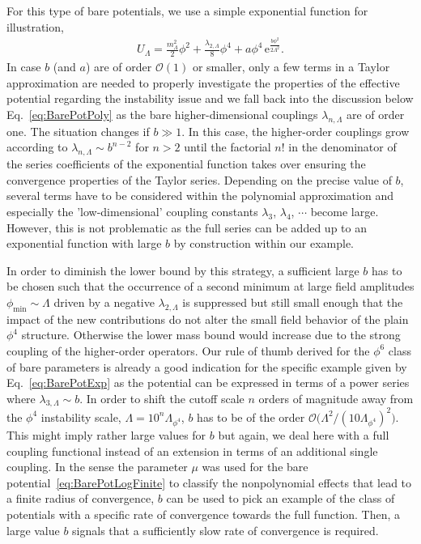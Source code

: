 \documentclass[twocolumn,aps,prd,showpacs,nofootinbib,superscriptaddress,preprintnumbers,floatfix,10pt]{revtex4-1}
\newcommand{\E}{\mathrm{e}}
\newcommand{\UL}{U_{\Lambda}}
\newcommand{\mL}{m_\Lambda^2}
\newcommand{\lL}{\lambda_{2,\Lambda}}
\begin{document}
For this type of bare potentials, we use a simple exponential function for illustration,
%
\begin{align}
 \UL = \frac{\mL}{2}\phi^{2} + \frac{\lL}{8}\phi^{4} + a \phi^{4}\, \E^{\frac{b\phi^2}{2\Lambda^{2}} }.
 \label{eq:BarePotExp}
\end{align}
%
In case $b$ (and $a$) are of order $\mathcal{O}(1)$ or smaller, only a few terms in a Taylor approximation are needed to properly investigate the properties of the effective potential regarding the instability issue and we fall back into the discussion below Eq.~\eqref{eq:BarePotPoly} as the bare higher-dimensional couplings $\lambda_{n,\Lambda}$ are of order one. 
The situation changes if $b\gg 1$. In this case, the higher-order couplings grow according to $\lambda_{n,\Lambda} \sim b^{n-2}$ for $n>2$ until the factorial $n!$ in the denominator of the series coefficients of the exponential function takes over ensuring the convergence properties of the Taylor series. Depending on the precise value of $b$, several terms have to be considered within the polynomial approximation and especially the 'low-dimensional' coupling constants $\lambda_{3}$, $\lambda_{4}$, $\cdots$ become large. 
However, this is not problematic as the full series can be added up to an exponential function with large $b$ by construction within our example. 


In order to diminish the lower bound by this strategy, a sufficient large $b$ has to be chosen such that the occurrence of a second minimum at large field amplitudes $\phi_{\mathrm{min}}\sim \Lambda$ driven by a negative $\lL$ is suppressed but still small enough that the impact of the new contributions do not alter the small field behavior of the plain $\phi^{4}$ structure. Otherwise the lower mass bound would increase due to the strong coupling of the higher-order operators. Our rule of thumb derived for the $\phi^{6}$ class of bare parameters is already a good indication for the specific example given by Eq.~\eqref{eq:BarePotExp} as the potential can be expressed in terms of a power series where $\lambda_{3,\Lambda} \sim b$. In order to shift the cutoff scale $n$ orders of magnitude away from the $\phi^{4}$ instability scale, $\Lambda = 10^{n}\Lambda_{\phi^{4}}$, $b$ has to be of the order $\mathcal{O}\big(\Lambda^{2}/(10\Lambda_{\phi^{4}})^{2}\big)$. This might imply rather large values for $b$ but again, we deal here with a full coupling functional instead of an extension in terms of an additional single coupling. In the sense the parameter $\mu$ was used for the bare potential~\eqref{eq:BarePotLogFinite} to classify the nonpolynomial effects that lead to a finite radius of convergence, $b$ can be used to pick an example of the class of potentials with a specific rate of convergence towards the full function. 
Then, a large value $b$ signals that a sufficiently slow rate of convergence is required.
\end{document}
